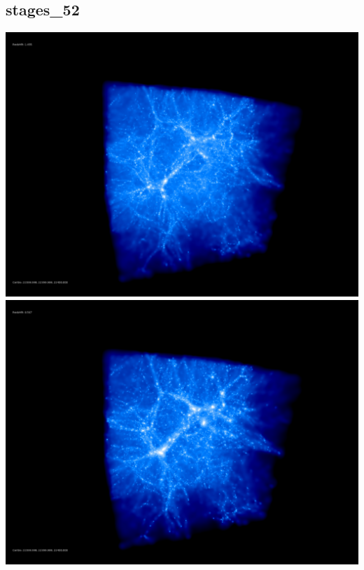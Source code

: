 \subsection{stages\_52}
\includegraphics[scale=0.1]{r256/stages_52/50.jpg} 
\includegraphics[scale=0.1]{r256/stages_52/100.jpg}  \\

